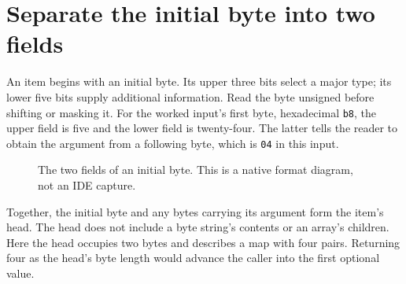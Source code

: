 \section{Separate the initial byte into two fields}
An item begins with an initial byte. Its upper three bits select a major type; its
lower five bits supply additional information. Read the byte unsigned before shifting
or masking it. For the worked input's first byte, hexadecimal \texttt{b8}, the upper
field is five and the lower field is twenty-four. The latter tells the reader to obtain
the argument from a following byte, which is \texttt{04} in this input.

\begin{figure}[htbp]
\centering
{}
\caption{The two fields of an initial byte. This is a native format diagram, not an IDE capture.}
\end{figure}

Together, the initial byte and any bytes carrying its argument form the item's head.
The head does not include a byte string's contents or an array's children. Here the
head occupies two bytes and describes a map with four pairs. Returning four as the
head's byte length would advance the caller into the first optional value.
